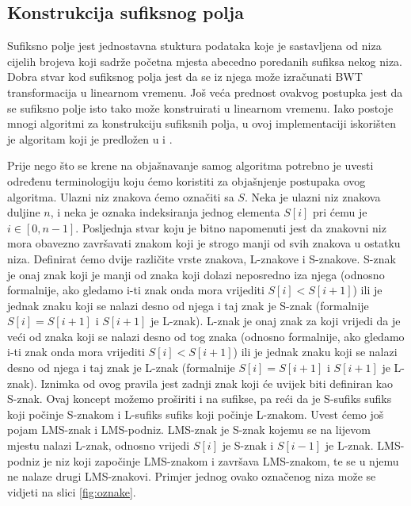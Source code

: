 \subsection{Konstrukcija sufiksnog polja}
Sufiksno polje jest jednostavna stuktura podataka koje je sastavljena od niza cijelih brojeva koji sadrže početna mjesta abecedno poredanih sufiksa nekog niza. Dobra stvar kod sufiksnog polja jest da se iz njega može izračunati BWT transformacija u linearnom vremenu. Još veća prednost ovakvog postupka jest da se sufiksno polje isto tako može konstruirati u linearnom vremenu. Iako postoje mnogi algoritmi za konstrukciju sufiksnih polja, u ovoj implementaciji iskorišten je algoritam koji je predložen u \cite{sais1} i \cite{sais2}. 

Prije nego što se krene na objašnavanje samog algoritma potrebno je uvesti određenu terminologiju koju ćemo koristiti za objašnjenje postupaka ovog algoritma. Ulazni niz znakova ćemo označiti sa $S$. Neka je ulazni niz znakova duljine $n$, i neka je oznaka indeksiranja jednog elementa $S[i]$ pri ćemu je $i \in [0,n-1]$. Posljednja stvar koju je bitno napomenuti jest da znakovni niz mora obavezno završavati znakom koji je strogo manji od svih znakova u ostatku niza.  Definirat ćemo dvije različite vrste znakova, L-znakove i S-znakove. S-znak je onaj znak koji je manji od znaka koji dolazi neposredno iza njega (odnosno formalnije, ako gledamo i-ti znak onda mora vrijediti $S[i]<S[i+1]$) ili je jednak znaku koji se nalazi desno od njega i taj znak je S-znak (formalnije $S[i]=S[i+1]$ i $S[i+1]$ je L-znak). L-znak je onaj znak za koji vrijedi da je veći od znaka koji se nalazi desno od tog znaka (odnosno formalnije, ako gledamo i-ti znak onda mora vrijediti $S[i]<S[i+1]$) ili je jednak znaku koji se nalazi desno od njega i taj znak je L-znak (formalnije $S[i]=S[i+1]$ i $S[i+1]$ je L-znak). Iznimka od ovog pravila jest zadnji znak koji će uvijek biti definiran kao S-znak. Ovaj koncept možemo proširiti i na sufikse, pa reći da je S-sufiks sufiks koji počinje S-znakom i L-sufiks sufiks koji počinje L-znakom. Uvest ćemo još pojam LMS-znak i LMS-podniz. LMS-znak je S-znak kojemu se na lijevom mjestu nalazi L-znak, odnosno vrijedi $S[i]$ je S-znak i $S[i-1]$ je L-znak. LMS-podniz je niz koji započinje LMS-znakom i završava LMS-znakom, te se u njemu ne nalaze drugi LMS-znakovi. Primjer jednog ovako označenog niza može se vidjeti na slici \ref{fig:oznake}.

